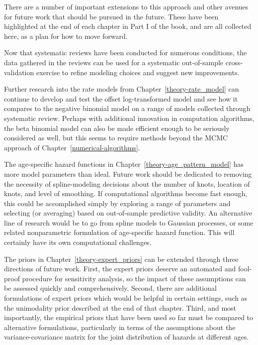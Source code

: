 There are a number of important extensions to this approach and other
avenues for future work that should be pursued in the future.  These
have been highlighted at the end of each chapter in Part I of the
book, and are all collected here, as a plan for how to move forward.

Now that systematic reviews have been conducted for numerous
conditions, the data gathered in the reviews can be used for a
systematic out-of-sample cross-validation exercise to refine modeling
choices and suggest new improvements.

Further research into the rate models from
Chapter~\ref{theory-rate_model} can continue to develop and test the
offset log-transformed model and see how it compares to the negative
binomial model on a range of models collected through systematic
review.  Perhaps with additional innovation in computation algorithms,
the beta binomial model can also be made efficient enough to be
seriously considered as well, but this seems to require methods beyond
the MCMC approach of Chapter~\ref{numerical-algorithms}.

The age-specific hazard functions in
Chapter~\ref{theory-age_pattern_model} has more model parameters than
ideal.  Future work should be dedicated to removing the necessity of
spline-modeling decisions about the number of knots, location of
knots, and level of smoothing.  If computational algorithms become
fast enough, this could be accomplished simply by exploring a range of
parameters and selecting (or averaging) based on out-of-sample
predictive validity.  An alternative line of research would be to go
from spline models to Gaussian processes, or some related
nonparametric formulation of age-specific hazard function.  This will
certainly have its own computational challenges.

The priors in Chapter~\ref{theory-expert_priors} can be extended
through three directions of future work. First, the expert priors
deserve an automated and fool-proof procedure for sensitivity
analysis, so the impact of these assumptions can be assessed quickly
and comprehensively. Second, there are additional formulations of
expert priors which would be helpful in certain settings, such as the
unimodality prior described at the end of that chapter.  Third, and
most importantly, the empirical priors that have been used so far must
be compared to alternative formulations, particularly in terms of the
assumptions about the variance-covariance matrix for the joint
distribution of hazards at different ages.

